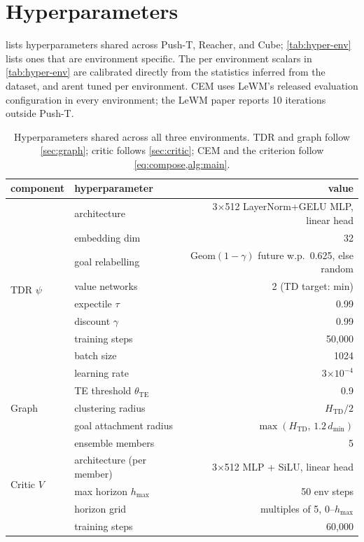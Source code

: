 \documentclass{article} %
\newcommand{\psiT}{\psi}
\newcommand{\Htd}{H_{\mathrm{TD}}}
\begin{document}
\section{Hyperparameters}
\label{app:hyperparams}
 lists hyperparameters shared across Push-T, Reacher, and Cube;
\cref{tab:hyper-env} lists ones that are environment specific. The per
environment scalars in \cref{tab:hyper-env} are calibrated directly from the statistics inferred from the dataset, and arent tuned per environment.
CEM uses LeWM's released evaluation configuration in every environment; the LeWM paper reports 10
iterations outside Push-T.

\begin{table}[h]
\centering\small
\caption{Hyperparameters shared across all three environments. TDR and graph follow \cref{sec:graph};
critic follows \cref{sec:critic}; CEM and the criterion follow \cref{eq:compose,alg:main}.}
\label{tab:hyper-shared}
\begin{tabular}{llr}
\toprule
component & hyperparameter & value \\
\midrule
\multirow{9}{*}{TDR $\psiT$}
 & architecture & 3$\times$512 LayerNorm+GELU MLP, linear head \\
 & embedding dim & 32 \\
 & goal relabelling & $\mathrm{Geom}(1-\gamma)$ future w.p.\ 0.625, else random \\
 & value networks & 2 (TD target: min) \\
 & expectile $\tau$ & 0.99 \\
 & discount $\gamma$ & 0.99 \\
 & training steps & 50{,}000 \\
 & batch size & 1024 \\
 & learning rate & 3$\times10^{-4}$ \\
\midrule
\multirow{3}{*}{Graph}
 & TE threshold $\theta_{\mathrm{TE}}$ & 0.9 \\
 & clustering radius & $\Htd/2$ \\
 & goal attachment radius & $\max(\Htd,\,1.2\,d_{\min})$ \\
\midrule
\multirow{12}{*}{Critic $V$}
 & ensemble members & 5 \\
 & architecture (per member) & 3$\times$512 MLP + SiLU, linear head \\
 & max horizon $h_{\max}$ & 50 env steps \\
 & horizon grid & multiples of 5, 0--$h_{\max}$ \\
 & training steps & 60{,}000 \\

\end{tabular}
\end{table}
\end{document}
